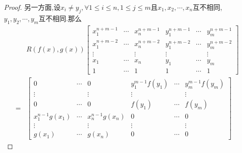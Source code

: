 {\begin{proof}
        另一方面,设$x_i\neq y_j,\forall 1\leqslant i\leqslant n,1\leqslant j\leqslant m$且$x_1,x_2,\cdots,x_n$互不相同,$y_1,y_2,\cdots,y_m$互不相同.那么
        \begin{align*}
              & R\left(f\left(x\right),g\left(x\right)\right)\begin{bmatrix}
                                                                 x_1^{n+m-1} & \cdots & x_n^{n+m-1} & y_1^{n+m-1} & \cdots & y_m^{n+m-1} \\
                                                                 x_1^{n+m-2} & \cdots & x_n^{n+m-2} & y_1^{n+m-2} & \cdots & y_m^{n+m-2} \\
                                                                 \vdots      &        & \vdots      & \vdots      &        & \vdots      \\
                                                                 x_1         & \cdots & x_n         & y_1         & \cdots & y_m         \\
                                                                 1           & \cdots & 1           & 1           & \cdots & 1
                                                             \end{bmatrix} \\
            = &
            \begin{bmatrix}
                0                          & \cdots & 0                          & y_1^{m-1}f\left(y_1\right) & \cdots & y_m^{m-1}f\left(y_m\right) \\
                \vdots                     &        & \vdots                     & \vdots                     &        & \vdots                     \\
                0                          & \cdots & 0                          & f\left(y_1\right)          & \cdots & f\left(y_m\right)          \\
                x_1^{n-1}g\left(x_1\right) & \cdots & x_n^{n-1}g\left(x_n\right) & 0                          & \cdots & 0                          \\
                \vdots                     &        & \vdots                     & \vdots                     &        & \vdots                     \\
                g\left(x_1\right)          & \cdots & g\left(x_n\right)          & 0                          & \cdots & 0
            \end{bmatrix}
        \end{align*}

\end{proof}}

